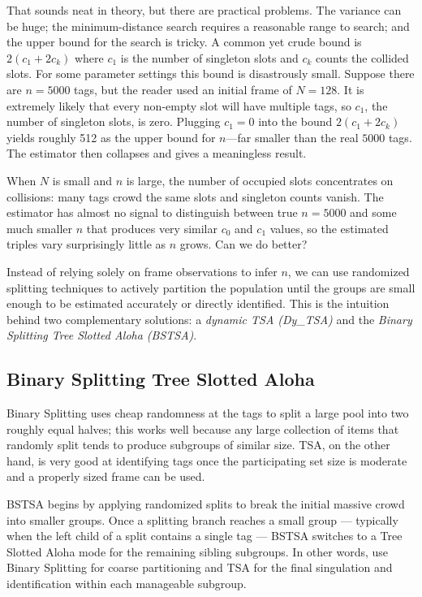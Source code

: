 That sounds neat in theory, but there are practical problems. The variance can be huge; the minimum-distance search requires a reasonable range to search; and the upper bound for the search is tricky. A common yet crude bound is $2(c_1 + 2 c_k)$ where $c_1$ is the number of singleton slots and $c_k$ counts the collided slots. For some parameter settings this bound is disastrously small. Suppose there are $n = 5000$ tags, but the reader used an initial frame of $N = 128$. It is extremely likely that every non-empty slot will have multiple tags, so $c_1$, the number of singleton slots, is zero. Plugging $c_1 = 0$ into the bound $2(c_1 + 2 c_k)$ yields roughly 512 as the upper bound for $n$—far smaller than the real $5000$ tags. The estimator then collapses and gives a meaningless result.

When $N$ is small and $n$ is large, the number of occupied slots concentrates on collisions: many tags crowd the same slots and singleton counts vanish. The estimator has almost no signal to distinguish between true $n = 5000$ and some much smaller $n$ that produces very similar $c_0$ and $c_1$ values, so the estimated triples vary surprisingly little as $n$ grows.
Can we do better? 

Instead of relying solely on frame observations to infer $n$, we can use randomized splitting techniques to actively partition the population until the groups are small enough to be estimated accurately or directly identified. This is the intuition behind two complementary solutions: a \textit{dynamic TSA (Dy\_TSA)} and the \textit{Binary Splitting Tree Slotted Aloha (BSTSA)}.

\subsection{Binary Splitting Tree Slotted Aloha}
Binary Splitting uses cheap randomness at the tags to split a large pool into two roughly equal halves; this works well because any large collection of items that randomly split tends to produce subgroups of similar size. TSA, on the other hand, is very good at identifying tags once the participating set size is moderate and a properly sized frame can be used.

BSTSA begins by applying randomized splits to break the initial massive crowd into smaller groups. Once a splitting branch reaches a small group — typically when the left child of a split contains a single tag — BSTSA switches to a Tree Slotted Aloha mode for the remaining sibling subgroups. In other words, use Binary Splitting for coarse partitioning and TSA for the final singulation and identification within each manageable subgroup.

